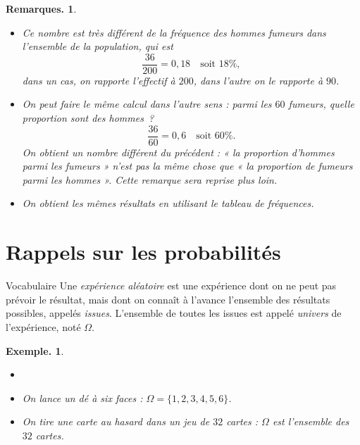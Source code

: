 \documentclass[12pt]{article}
\theoremstyle{break}
\newtheorem*{example}{Exemple.}
\newtheorem*{remarks}{Remarques.}
\begin{document}
\begin{remarks}
  \begin{itemize}
    \item Ce nombre est très différent de la fréquence des hommes fumeurs \emph{dans l'ensemble de la population}, qui est 
    $$\dfrac{36}{200}=0{,}18\quad \text{soit } 18\%,$$
    dans un cas, on rapporte l'effectif à $200$, dans l'autre on le rapporte à $90$.
    \item On peut faire le même calcul dans l'autre sens : parmi les $60$ fumeurs, quelle proportion sont des hommes~?
    \[
    \frac{36}{60} = 0{,}6 \quad \text{soit } 60\%.
    \]
    On obtient un nombre différent du précédent : « la proportion d'hommes parmi les fumeurs » n'est pas la même chose que « la proportion de fumeurs parmi les hommes ». Cette remarque sera reprise plus loin.
    \item On obtient les mêmes résultats en utilisant le tableau de fréquences.
  \end{itemize}
 
\end{remarks}
 


\newpage

\section{Rappels sur les probabilités}



\begin{definition}{Vocabulaire}{}
  Une \emph{expérience aléatoire} est une expérience dont on ne peut pas prévoir le résultat, mais dont on connaît à l'avance l'ensemble des résultats possibles, appelés \emph{issues}. L'ensemble de toutes les issues est appelé \emph{univers} de l'expérience, noté $\Omega$.
\end{definition}
 
\begin{example}
  \begin{itemize}
    \item[]
    \item On lance un dé à six faces : $\Omega = \{1,2,3,4,5,6\}$.
    \item On tire une carte au hasard dans un jeu de $32$ cartes : $\Omega$ est l'ensemble des $32$ cartes.
  \end{itemize}
\end{example}
 
\end{document}
